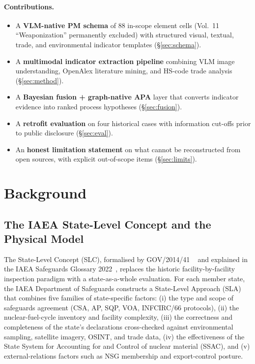 \documentclass[11pt,a4paper]{article}
\begin{document}
\paragraph{Contributions.}
\begin{itemize}[leftmargin=*,itemsep=2pt]
  \item A \textbf{VLM-native PM schema} of 88 in-scope element cells
        (Vol.~11 ``Weaponization'' permanently excluded) with
        structured visual, textual, trade, and environmental indicator
        templates (\S\ref{sec:schema}).
  \item A \textbf{multimodal indicator extraction pipeline} combining
        VLM image understanding, OpenAlex literature mining, and HS-code
        trade analysis (\S\ref{sec:method}).
  \item A \textbf{Bayesian fusion + graph-native APA} layer that
        converts indicator evidence into ranked process hypotheses
        (\S\ref{sec:fusion}).
  \item A \textbf{retrofit evaluation} on four historical cases with
        information cut-offs prior to public disclosure
        (\S\ref{sec:eval}).
  \item An \textbf{honest limitation statement} on what cannot be
        reconstructed from open sources, with explicit out-of-scope
        items (\S\ref{sec:limits}).
\end{itemize}

\section{Background}\label{sec:bg}

\subsection{The IAEA State-Level Concept and the Physical Model}

The State-Level Concept (SLC), formalised by GOV/2014/41
~\cite{IAEAGov201441} and explained in the IAEA Safeguards Glossary
2022~\cite{IAEAGlossary2022}, replaces the historic facility-by-facility
inspection paradigm with a state-as-a-whole evaluation. For each member
state, the IAEA Department of Safeguards constructs a State-Level
Approach (SLA) that combines five families of state-specific factors:
(i) the type and scope of safeguards agreement (CSA, AP, SQP, VOA,
INFCIRC/66 protocols), (ii) the nuclear-fuel-cycle inventory and
facility complexity, (iii) the correctness and completeness of the
state's declarations cross-checked against environmental sampling,
satellite imagery, OSINT, and trade data, (iv) the effectiveness of the
State System for Accounting for and Control of nuclear material
(SSAC), and (v) external-relations factors such as NSG membership and
export-control posture.
\end{document}
